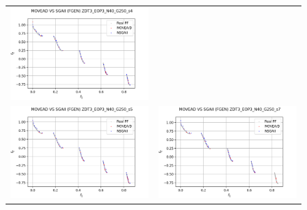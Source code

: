 \begin{figure}[H]
\begin{tabular}{c c}
    \includegraphics[scale=0.5]{figures/ZDT3_EOP3_N40_G250_T6/s4_comp.png}\\
    \includegraphics[scale=0.5]{figures/ZDT3_EOP3_N40_G250_T6/s5_comp.png} &
    \includegraphics[scale=0.5]{figures/ZDT3_EOP3_N40_G250_T6/s7_comp.png}\\

\end{tabular}
\end{figure}
